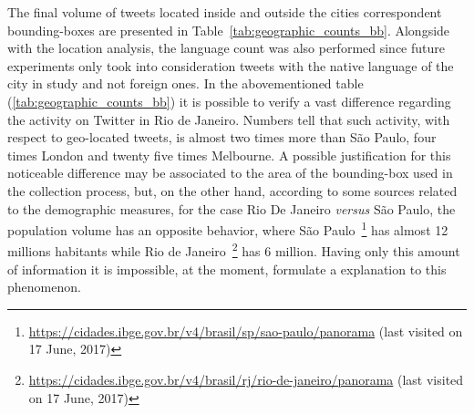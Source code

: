 The final volume of tweets located inside and outside the cities correspondent bounding-boxes are presented in Table~\ref{tab:geographic_counts_bb}. Alongside with the location analysis, the language count was also performed since future experiments only took into consideration tweets with the native language of the city in study and not foreign ones. In the abovementioned table (\ref{tab:geographic_counts_bb}) it is possible to verify a vast difference regarding the activity on Twitter in Rio de Janeiro. Numbers tell that such activity, with respect to geo-located tweets, is almost two times more than São Paulo, four times London and twenty five times Melbourne. A possible justification for this noticeable difference may be associated to the area of the bounding-box used in the collection process, but, on the other hand, according to some sources related to the demographic measures, for the case Rio De Janeiro \textit{versus} São Paulo, the population volume has an opposite behavior, where São Paulo~\footnote{\url{https://cidades.ibge.gov.br/v4/brasil/sp/sao-paulo/panorama} (last visited on 17 June, 2017)} has almost 12 millions habitants while Rio de Janeiro~\footnote{\url{https://cidades.ibge.gov.br/v4/brasil/rj/rio-de-janeiro/panorama} (last visited on 17 June, 2017)} has 6 million. Having only this amount of information it is impossible, at the moment, formulate a explanation to this phenomenon.

